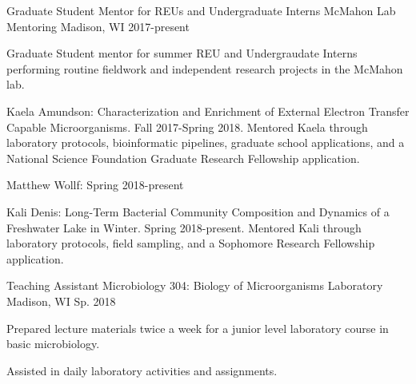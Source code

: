 

\begin{cventries}

  \cventry
    {Graduate Student Mentor for REUs and Undergraduate Interns} %
    {McMahon Lab Mentoring} %
    {Madison, WI} %
    {2017-present} %
    {
      \begin{cvitems} %
        \item {Graduate Student mentor for summer REU and Undergraudate Interns performing routine fieldwork and independent research projects in the McMahon lab.}
        \item {Kaela Amundson: Characterization and Enrichment of External Electron Transfer Capable Microorganisms. Fall 2017-Spring 2018. Mentored Kaela through laboratory protocols, bioinformatic pipelines, graduate school applications, and a National Science Foundation Graduate Research Fellowship application.}
        \item {Matthew Wollf: Spring 2018-present}
        \item {Kali Denis: Long-Term Bacterial Community Composition and Dynamics of a Freshwater Lake in Winter. Spring 2018-present. Mentored Kali through laboratory protocols, field sampling, and a Sophomore Research Fellowship application.}
      \end{cvitems}
    }

  \cventry
    {Teaching Assistant} %
    {Microbiology 304: Biology of Microorganisms Laboratory} %
    {Madison, WI} %
    {Sp. 2018} %
    {
      \begin{cvitems} %
        \item {Prepared lecture materials twice a week for a junior level laboratory course in basic microbiology.}
        \item {Assisted in daily laboratory activities and assignments.}
      \end{cvitems}
    }


\end{cventries}
